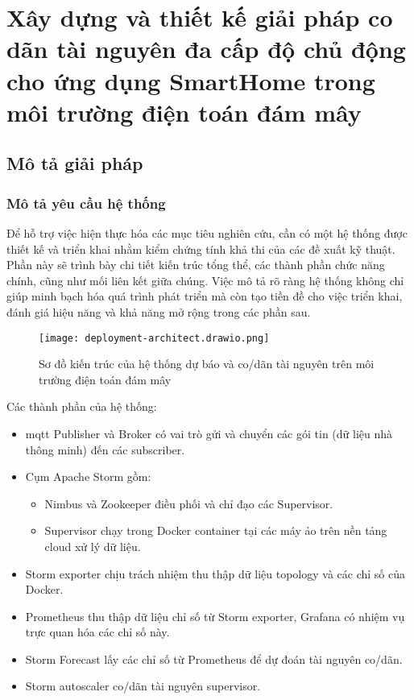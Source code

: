\chapter{Xây dựng và thiết kế giải pháp co dãn tài nguyên đa cấp độ chủ động cho ứng dụng SmartHome trong môi trường điện toán đám mây}

\section{Mô tả giải pháp}

\subsection{Mô tả yêu cầu hệ thống}

Để hỗ trợ việc hiện thực hóa các mục tiêu nghiên cứu, cần có một hệ thống được thiết kế và triển khai nhằm kiểm chứng tính khả thi của các đề xuất kỹ thuật. Phần này sẽ trình bày chi tiết kiến trúc tổng thể, các thành phần chức năng chính, cũng như mối liên kết giữa chúng. Việc mô tả rõ ràng hệ thống không chỉ giúp minh bạch hóa quá trình phát triển mà còn tạo tiền đề cho việc triển khai, đánh giá hiệu năng và khả năng mở rộng trong các phần sau.

\begin{figure}[htbp]
    \centering
    \texttt{[image: deployment-architect.drawio.png]}
    \caption{Sơ đồ kiến trúc của hệ thống dự báo và co/dãn tài nguyên trên môi trường điện toán đám mây}
\end{figure}

Các thành phần của hệ thống:

\begin{itemize}
    \item \acrshort{mqtt} Publisher và Broker có vai trò gửi và chuyển các gói tin (dữ liệu nhà thông minh) đến các subscriber.
    \item Cụm Apache Storm gồm:
          \begin{itemize}
              \item Nimbus và Zookeeper điều phối và chỉ đạo các Supervisor.
              \item Supervisor chạy trong Docker container tại các máy ảo trên nền tảng cloud xử lý dữ liệu.
          \end{itemize}
    \item Storm exporter chịu trách nhiệm thu thập dữ liệu topology và các chỉ số của Docker.
    \item Prometheus thu thập dữ liệu chỉ số từ Storm exporter, Grafana có nhiệm vụ trực quan hóa các chỉ số này.
    \item Storm Forecast lấy các chỉ số từ Prometheus để dự đoán tài nguyên co/dãn.
    \item Storm autoscaler co/dãn tài nguyên supervisor.
\end{itemize}

